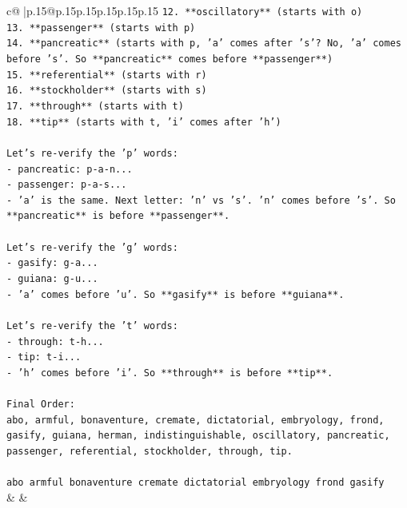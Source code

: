 \documentclass{article}
\begin{document}
{\begin{supertabular}{c@{$\;$}|p{.15\linewidth}@{}p{.15\linewidth}p{.15\linewidth}p{.15\linewidth}p{.15\linewidth}p{.15\linewidth}}
{{{\texttt{12. **oscillatory** (starts with o)} \\
\texttt{13. **passenger** (starts with p)} \\
\texttt{14. **pancreatic** (starts with p, 'a' comes after 's'? No, 'a' comes before 's'. So **pancreatic** comes before **passenger**)} \\
\texttt{15. **referential** (starts with r)} \\
\texttt{16. **stockholder** (starts with s)} \\
\texttt{17. **through** (starts with t)} \\
\texttt{18. **tip** (starts with t, 'i' comes after 'h')} \\
\\ 
\texttt{Let's re{-}verify the 'p' words:} \\
\texttt{{-} pancreatic: p{-}a{-}n...} \\
\texttt{{-} passenger: p{-}a{-}s...} \\
\texttt{{-} 'a' is the same. Next letter: 'n' vs 's'. 'n' comes before 's'. So **pancreatic** is before **passenger**.} \\
\\ 
\texttt{Let's re{-}verify the 'g' words:} \\
\texttt{{-} gasify: g{-}a...} \\
\texttt{{-} guiana: g{-}u...} \\
\texttt{{-} 'a' comes before 'u'. So **gasify** is before **guiana**.} \\
\\ 
\texttt{Let's re{-}verify the 't' words:} \\
\texttt{{-} through: t{-}h...} \\
\texttt{{-} tip: t{-}i...} \\
\texttt{{-} 'h' comes before 'i'. So **through** is before **tip**.} \\
\\ 
\texttt{Final Order:} \\
\texttt{abo, armful, bonaventure, cremate, dictatorial, embryology, frond, gasify, guiana, herman, indistinguishable, oscillatory, pancreatic, passenger, referential, stockholder, through, tip.} \\
\\ 
\texttt{abo armful bonaventure cremate dictatorial embryology frond gasify} \\
            }
        }
    }
    & & \\ \\


\end{supertabular}}
\end{document}
